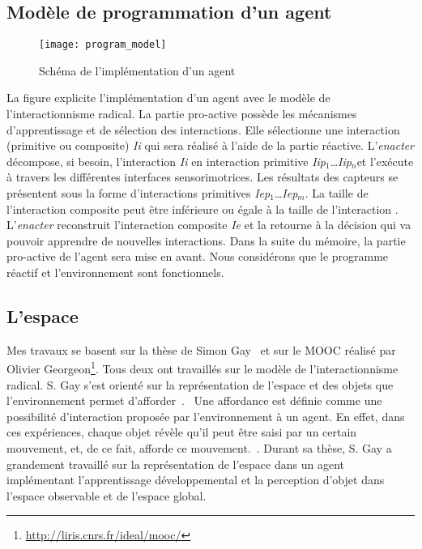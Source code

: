 \documentclass{llncs}
\begin{document}
\subsection{Modèle de programmation d'un agent}
\begin{figure}
	\centering
	\texttt{[image: program\_model]}
	\caption{Schéma de l'implémentation d'un agent}
	\label{fig:prog_model}
\end{figure}
La figure  explicite l'implémentation d'un agent avec le modèle de l'interactionnisme radical. La partie pro-active possède les mécanismes d'apprentissage et de sélection des interactions. Elle sélectionne une interaction (primitive ou composite) \emph{Ii} qui sera réalisé à l'aide de la partie réactive. L'\emph{enacter} décompose, si besoin, l'interaction \intended \emph{Ii} en interaction primitive \emph{Iip$_1$}…\emph{Iip$_n$}et l'exécute à travers les différentes interfaces sensorimotrices. Les résultats des capteurs se présentent sous la forme d'interactions primitives \enacted \emph{Iep$_1$}…\emph{Iep$_m$}. La taille de l'interaction composite \enacted peut être inférieure ou égale à la taille de l'interaction \intended. L'\emph{enacter} reconstruit l'interaction composite \enacted \emph{Ie} et la retourne à la décision qui va pouvoir apprendre de nouvelles interactions. Dans la suite du mémoire, la partie pro-active de l'agent sera mise en avant. Nous considérons que le programme réactif et l'environnement sont fonctionnels. 

\subsection{L'espace}
Mes travaux se basent sur la thèse de Simon Gay~\cite{Liris-7032-simon-thesis} et sur le MOOC réalisé par Olivier Georgeon\footnote{\url{http://liris.cnrs.fr/ideal/mooc/}}. Tous deux ont travaillés sur le modèle de l'interactionnisme radical. S. Gay s'est orienté sur la représentation de l'espace et des objets que l'environnement permet d'afforder~\cite{affordance-gibson}. \og~Une affordance est définie comme une possibilité d'interaction proposée par l'environnement à un agent. En effet, dans ces expériences, chaque objet révèle qu'il peut être saisi par un certain mouvement, et, de ce fait, afforde ce mouvement.~\fg. Durant sa thèse, S. Gay a grandement travaillé sur la représentation de l'espace dans un agent implémentant l'apprentissage développemental et la perception d'objet dans l'espace observable et de l'espace global. 
\end{document}
